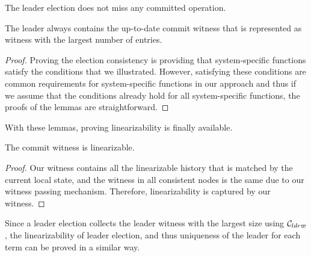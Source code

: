 \begin{lemma}\label{lemma:chapter:witnesspassing:election-consistency}
The leader election does not miss any committed operation.
\end{lemma}

\begin{lemma} 
The leader always contains the up-to-date commit witness that is represented as
witness with the largest number of entries.
\end{lemma}

\begin{proof}
Proving the election consistency is providing that system-specific functions satisfy the conditions that we illustrated. However, satisfying these
conditions are common requirements for system-specific functions in
our approach and thus if we assume that the conditions already hold for all
system-specific functions, the proofs of the lemmas are straightforward.
\end{proof}

With these lemmas, proving  linearizability is finally available.

\begin{theorem}[linearizability]\label{theorem:chapter:witnesspassing:linear-spec}
The commit witness is linearizable.
\end{theorem}

\begin{proof}
Our witness contains all the linearizable history that is matched by the current local state, 
and the witness in all consistent nodes is the same due to our witness passing mechanism. 
Therefore, linearizability is captured by our witness.
\end{proof}

Since a leader election collects the leader witness with the largest
size using $\mathcal{C}_{ldr\varpi}$, the linearizability of leader election, and thus uniqueness of the leader
for each term can be proved in a similar way. 
